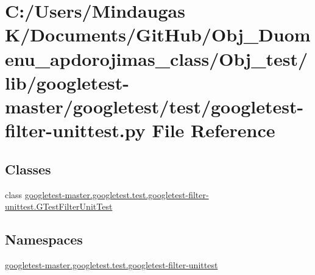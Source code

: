 \hypertarget{_obj__test_2lib_2googletest-master_2googletest_2test_2googletest-filter-unittest_8py}{}\section{C\+:/\+Users/\+Mindaugas K/\+Documents/\+Git\+Hub/\+Obj\+\_\+\+Duomenu\+\_\+apdorojimas\+\_\+class/\+Obj\+\_\+test/lib/googletest-\/master/googletest/test/googletest-\/filter-\/unittest.py File Reference}
\label{_obj__test_2lib_2googletest-master_2googletest_2test_2googletest-filter-unittest_8py}
\subsection*{Classes}
\begin{DoxyCompactItemize}
\item 
class \mbox{\hyperlink{classgoogletest-master_1_1googletest_1_1test_1_1googletest-filter-unittest_1_1_g_test_filter_unit_test}{googletest-\/master.\+googletest.\+test.\+googletest-\/filter-\/unittest.\+G\+Test\+Filter\+Unit\+Test}}
\end{DoxyCompactItemize}
\subsection*{Namespaces}
\begin{DoxyCompactItemize}
\item 
 \mbox{\hyperlink{namespacegoogletest-master_1_1googletest_1_1test_1_1googletest-filter-unittest}{googletest-\/master.\+googletest.\+test.\+googletest-\/filter-\/unittest}}
\end{DoxyCompactItemize}
